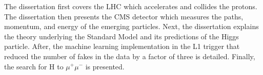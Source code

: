 The dissertation first covers the LHC which accelerates and collides the protons. The dissertation then presents the CMS detector which measures the paths, momentum, and energy of the emerging particles. Next, the dissertation explains the theory underlying the Standard Model and its predictions of the Higgs particle. After, the machine learning implementation in the L1 trigger that reduced the number of fakes in the data by a factor of three is detailed. Finally, the search for H to $\mu^{+}\mu^{-}$ is presented.
